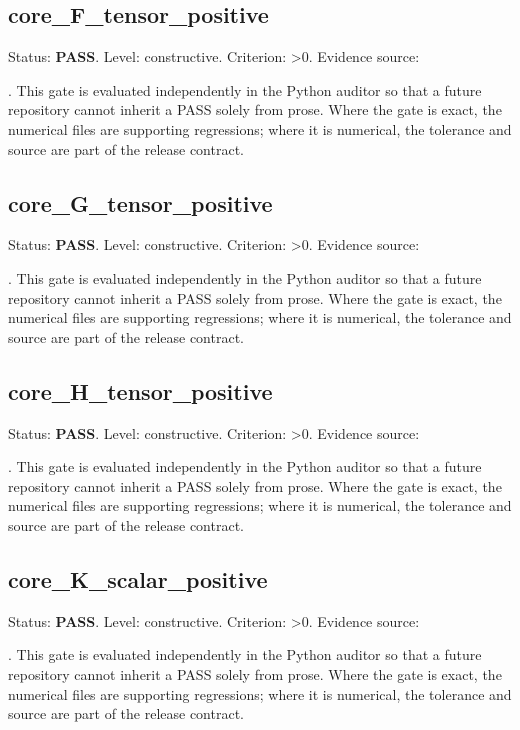 \documentclass[11pt,a4paper,oneside]{book}
\begin{document}
\subsection{core\_F\_tensor\_positive}
Status: \textbf{PASS}. Level: constructive. Criterion: >0. Evidence source:\par\noindent{}. This gate is evaluated independently in the Python auditor so that a future repository cannot inherit a PASS solely from prose. Where the gate is exact, the numerical files are supporting regressions; where it is numerical, the tolerance and source are part of the release contract.\par

\subsection{core\_G\_tensor\_positive}
Status: \textbf{PASS}. Level: constructive. Criterion: >0. Evidence source:\par\noindent{}. This gate is evaluated independently in the Python auditor so that a future repository cannot inherit a PASS solely from prose. Where the gate is exact, the numerical files are supporting regressions; where it is numerical, the tolerance and source are part of the release contract.\par

\subsection{core\_H\_tensor\_positive}
Status: \textbf{PASS}. Level: constructive. Criterion: >0. Evidence source:\par\noindent{}. This gate is evaluated independently in the Python auditor so that a future repository cannot inherit a PASS solely from prose. Where the gate is exact, the numerical files are supporting regressions; where it is numerical, the tolerance and source are part of the release contract.\par

\subsection{core\_K\_scalar\_positive}
Status: \textbf{PASS}. Level: constructive. Criterion: >0. Evidence source:\par\noindent{}. This gate is evaluated independently in the Python auditor so that a future repository cannot inherit a PASS solely from prose. Where the gate is exact, the numerical files are supporting regressions; where it is numerical, the tolerance and source are part of the release contract.\par
\end{document}
